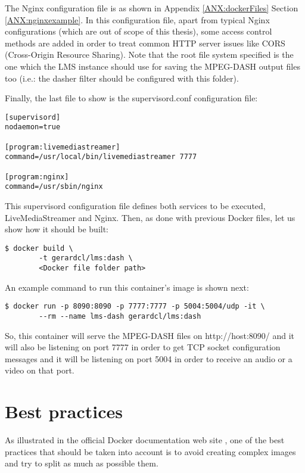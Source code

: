 The Nginx configuration file is as shown in Appendix \ref{ANX:dockerFiles} Section \ref{ANX:nginxexample}. In this configuration file, apart from typical Nginx configurations (which are out of scope of this thesis), some access control methods are added in order to treat common HTTP server issues like CORS (Cross-Origin Resource Sharing). Note that the root file system specified is the one which the LMS instance should use for saving the MPEG-DASH output files too (i.e.: the dasher filter should be configured with this folder).

Finally, the last file to show is the supervisord.conf configuration file:

\begin{verbatim}
[supervisord]
nodaemon=true

[program:livemediastreamer]
command=/usr/local/bin/livemediastreamer 7777

[program:nginx]
command=/usr/sbin/nginx 
\end{verbatim}

This supervisord configuration file defines both services to be executed, LiveMediaStreamer and Nginx. Then, as done with previous Docker files, let us show how it should be built:

\begin{verbatim}
$ docker build \
		-t gerardcl/lms:dash \
		<Docker file folder path>
\end{verbatim}

An example command to run this container's image is shown next:

\begin{verbatim}
$ docker run -p 8090:8090 -p 7777:7777 -p 5004:5004/udp -it \
		--rm --name lms-dash gerardcl/lms:dash 
\end{verbatim}

So, this container will serve the MPEG-DASH files on http://host:8090/ and it will also be listening on port 7777 in order to get TCP socket configuration messages and it will be listening on port 5004 in order to receive an audio or a video on that port.

\section{Best practices}

As illustrated in the official Docker documentation web site \cite{dockerBP}, one of the best practices that should be taken into account is to avoid creating complex images and try to split as much as possible them.

